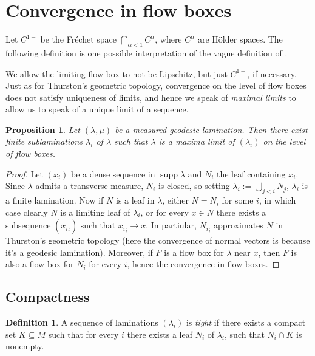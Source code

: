 \documentclass[reqno,11pt]{amsart}
\DeclareMathOperator{\supp}{supp}
\newcommand{\dfn}[1]{\emph{#1}\index{#1}}
\newtheorem{proposition}[theorem]{Proposition}
\theoremstyle{definition}
\newtheorem{definition}[theorem]{Definition}
\numberwithin{equation}{section}
\begin{document}

\section{Convergence in flow boxes}
Let $C^{1-}$ be the Fr\'echet space $\bigcap_{\alpha < 1} C^\alpha$, where $C^\alpha$ are H\"older spaces.
The following definition is one possible interpretation of the vague definition of \cite[Lemma II.1.2]{ColdingMinicozziV}.



We allow the limiting flow box to not be Lipschitz, but just $C^{1-}$, if necessary.
Just as for Thurston's geometric topology, convergence on the level of flow boxes does not satisfy uniqueness of limits, and hence we speak of \dfn{maximal limits} to allow us to speak of a unique limit of a sequence.

\begin{proposition}
Let $(\lambda, \mu)$ be a measured geodesic lamination.
Then there exist finite sublaminations $\lambda_i$ of $\lambda$ such that $\lambda$ is a maxima limit of $(\lambda_i)$ on the level of flow boxes.
\end{proposition}
\begin{proof}
Let $(x_i)$ be a dense sequence in $\supp \lambda$ and $N_i$ the leaf containing $x_i$.
Since $\lambda$ admits a transverse measure, $N_i$ is closed, so setting $\lambda_i := \bigcup_{j < i} N_j$, $\lambda_i$ is a finite lamination.
Now if $N$ is a leaf in $\lambda$, either $N = N_i$ for some $i$, in which case clearly $N$ is a limiting leaf of $\lambda_i$, or for every $x \in N$ there exists a subsequence $(x_{i_j})$ such that $x_{i_j} \to x$.
In partiular, $N_{i_j}$ approximates $N$ in Thurston's geometric topology (here the convergence of normal vectors is because it's a geodesic lamination).
Moreover, if $F$ is a flow box for $\lambda$ near $x$, then $F$ is also a flow box for $N_i$ for every $i$, hence the convergence in flow boxes.
\end{proof}


\subsection{Compactness}
\begin{definition}
A sequence of laminations $(\lambda_i)$ is \dfn{tight} if there exists a compact set $K \subseteq M$ such that for every $i$ there exists a leaf $N_i$ of $\lambda_i$, such that $N_i \cap K$ is nonempty.
\end{definition}
\end{document}
